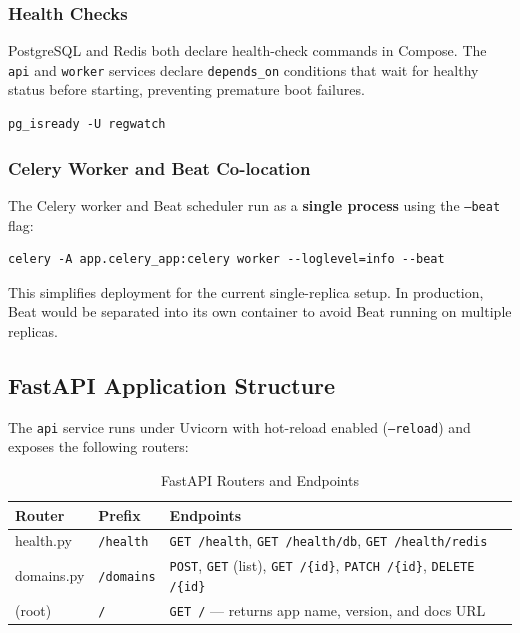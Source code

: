 \documentclass[12pt,a4paper]{article}
\begin{document}
\subsubsection{Health Checks}

PostgreSQL and Redis both declare health-check commands in Compose. The \texttt{api} and \texttt{worker} services declare \texttt{depends\_on} conditions that wait for healthy status before starting, preventing premature boot failures.

\begin{lstlisting}[style=shellstyle, caption={PostgreSQL health check}]
pg_isready -U regwatch
\end{lstlisting}

\subsubsection{Celery Worker and Beat Co-location}

The Celery worker and Beat scheduler run as a \textbf{single process} using the \texttt{--beat} flag:

\begin{lstlisting}[style=shellstyle, caption={Worker start command}]
celery -A app.celery_app:celery worker --loglevel=info --beat
\end{lstlisting}

This simplifies deployment for the current single-replica setup. In production, Beat would be separated into its own container to avoid Beat running on multiple replicas.

\subsection{FastAPI Application Structure}

The \texttt{api} service runs under Uvicorn with hot-reload enabled (\texttt{--reload}) and exposes the following routers:

\begin{table}[H]
\centering
\caption{FastAPI Routers and Endpoints}\label{tab:routers}
\begin{tabularx}{\textwidth}{@{}l l X@{}}
\toprule
\textbf{Router} & \textbf{Prefix} & \textbf{Endpoints} \\
\midrule
health.py   & \texttt{/health}  & \texttt{GET /health}, \texttt{GET /health/db}, \texttt{GET /health/redis} \\
domains.py  & \texttt{/domains} & \texttt{POST}, \texttt{GET} (list), \texttt{GET /\{id\}}, \texttt{PATCH /\{id\}}, \texttt{DELETE /\{id\}} \\
(root)      & \texttt{/}        & \texttt{GET /} — returns app name, version, and docs URL \\
\bottomrule
\end{tabularx}
\end{table}
\end{document}
